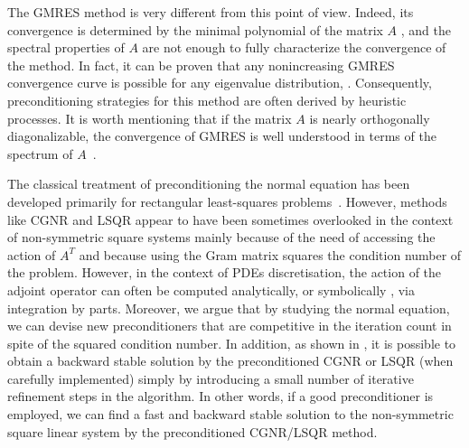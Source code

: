 \documentclass[hidelinks,onefignum,onetabnum]{siamart220329}
\newcommand{\bb}[1]{#1}
\begin{document}
The GMRES method is very different from this point of view. Indeed, its convergence is determined by the minimal polynomial of the matrix ${A}$ \cite{Trefethen}, and the spectral properties of $A$ are not enough to fully characterize the convergence of the method. In fact, it can be proven that any nonincreasing GMRES convergence curve is possible for any eigenvalue distribution, \cite{Greenbaum, Strakos}.  Consequently, preconditioning strategies for this method are often derived by heuristic processes. It is worth mentioning that if the matrix $A$ is nearly orthogonally diagonalizable, the convergence of GMRES is well understood in terms of the spectrum of $A$~\cite[Theorem 35.2]{Trefethen}.

\bb{The classical treatment of preconditioning the normal
    equation has been developed primarily for rectangular least-squares
    problems~\cite{Saad2,axelsson1994iterative,scotttuma2025sparse}. However,}
methods like CGNR and LSQR appear to have been sometimes overlooked in the context of non-symmetric square systems mainly because of the need of accessing the action of $A^T$ and because using the Gram matrix squares the condition number of the problem. However, in the context of PDEs discretisation, the action of the adjoint operator can often be computed analytically, or symbolically \cite{dolfinAdjoint}, via integration by parts. Moreover, we argue that by studying the normal equation, we can devise new preconditioners that are competitive in the iteration count in spite of the squared condition number. In addition, as shown in \cite{epperly2025,Maike}, it is possible to obtain a backward stable solution by the preconditioned CGNR or LSQR (when carefully implemented) simply by introducing a small number of iterative refinement steps in the algorithm. In other words, if a good preconditioner is employed, we can find a fast and backward stable solution to the non-symmetric square linear system by the preconditioned CGNR/LSQR method.
\end{document}
